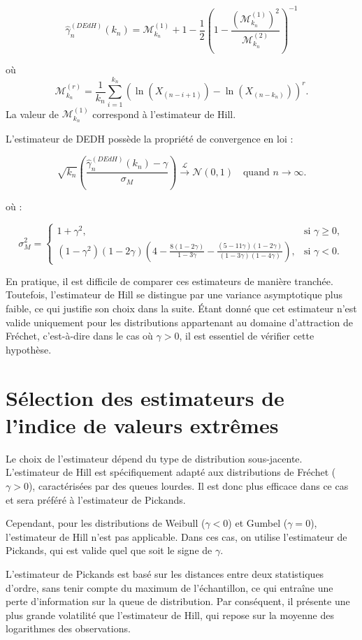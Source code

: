 \documentclass{article}
\begin{document}
\[
\hat{\gamma}_n^{(DEdH)}(k_n) = \mathcal{M}^{(1)}_{k_n} + 1 - \frac{1}{2} \left( 1 - \frac{(\mathcal{M}^{(1)}_{k_n})^2}{\mathcal{M}^{(2)}_{k_n}} \right)^{-1}
\]

où 
\[
\mathcal{M}^{(r)}_{k_n} = \frac{1}{k_n} \sum_{i=1}^{k_n} (\ln(X_{(n-i+1)}) - \ln(X_{(n-k_n)}))^r.
\]
La valeur de \(\mathcal{M}^{(1)}_{k_n}\) correspond à l'estimateur de Hill.

L'estimateur de DEDH possède la propriété de convergence en loi :

\[
\sqrt{k_n}(\frac{\hat{\gamma}_n^{(DEdH)}(k_n) - \gamma}{\sigma_M}) \xrightarrow{\mathcal{L}} \mathcal{N}(0,1) \quad \text{quand } n \to \infty.
\]

où :

\[
\sigma_M^2 = 
\begin{cases} 
1 + \gamma^2, & \text{si } \gamma \geq 0, \\ 
(1 - \gamma^2)(1 - 2\gamma)
\left( 4 - \frac{8 (1 - 2\gamma)}{1 - 3\gamma} - \frac{(5 - 11\gamma)(1 - 2\gamma)}{(1 - 3\gamma)(1 - 4\gamma)} \right), 
& \text{si } \gamma < 0.
\end{cases}
\]

En pratique, il est difficile de comparer ces estimateurs de manière tranchée. Toutefois, l'estimateur de Hill se distingue par une variance asymptotique plus faible, ce qui justifie son choix dans la suite. Étant donné que cet estimateur n'est valide uniquement pour les distributions appartenant au domaine d'attraction de Fréchet, c'est-à-dire dans le cas où \(\gamma > 0\), il est essentiel de vérifier cette hypothèse. 

\section{Sélection des estimateurs de l'indice de valeurs extrêmes}

Le choix de l’estimateur dépend du type de distribution sous-jacente. L’estimateur de Hill est spécifiquement adapté aux distributions de Fréchet (\(\gamma > 0\)), caractérisées par des queues lourdes. Il est donc plus efficace dans ce cas et sera préféré à l’estimateur de Pickands.  

Cependant, pour les distributions de Weibull (\(\gamma < 0\)) et Gumbel (\(\gamma = 0\)), l’estimateur de Hill n’est pas applicable. Dans ces cas, on utilise l’estimateur de Pickands, qui est valide quel que soit le signe de \( \gamma \).  

L'estimateur de Pickands est basé sur les distances entre deux statistiques d'ordre, sans tenir compte du maximum de l’échantillon, ce qui entraîne une perte d'information sur la queue de distribution. Par conséquent, il présente une plus grande volatilité que l'estimateur de Hill, qui repose sur la moyenne des logarithmes des observations.
\end{document}
